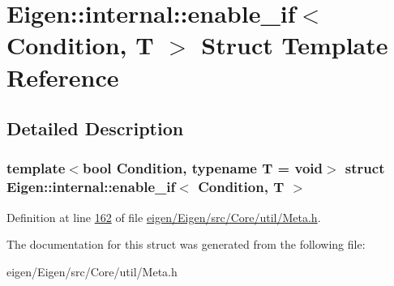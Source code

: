 \hypertarget{struct_eigen_1_1internal_1_1enable__if}{}\section{Eigen\+:\+:internal\+:\+:enable\+\_\+if$<$ Condition, T $>$ Struct Template Reference}
\label{struct_eigen_1_1internal_1_1enable__if}


\subsection{Detailed Description}
\subsubsection*{template$<$bool Condition, typename T = void$>$\newline
struct Eigen\+::internal\+::enable\+\_\+if$<$ Condition, T $>$}



Definition at line \hyperlink{eigen_2_eigen_2src_2_core_2util_2_meta_8h_source_l00162}{162} of file \hyperlink{eigen_2_eigen_2src_2_core_2util_2_meta_8h_source}{eigen/\+Eigen/src/\+Core/util/\+Meta.\+h}.



The documentation for this struct was generated from the following file\+:\begin{DoxyCompactItemize}
\item 
eigen/\+Eigen/src/\+Core/util/\+Meta.\+h\end{DoxyCompactItemize}
